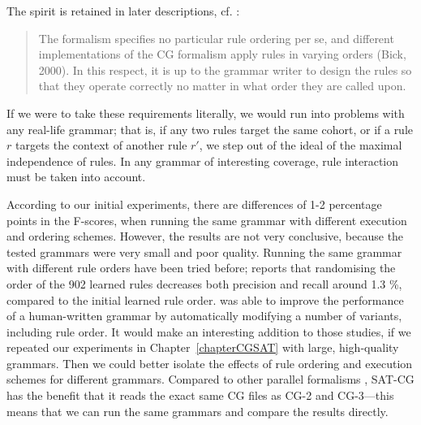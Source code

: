 \noindent The spirit is retained in later descriptions, cf. \cite{hulden2011cg_engine}:

\begin{quote} 
The formalism specifies no particular rule ordering per se, and different implementations of the CG formalism apply rules in varying orders (Bick, 2000).  In this respect, it is up to the grammar writer to design the rules so that they operate correctly no matter in what order they are called upon. 
\end{quote}

\noindent If we were to take these requirements literally, we would run into problems with any real-life grammar; that is, if any two rules target the same cohort, or if a rule $r$ targets the context of another rule $r'$, we step out of the ideal of the maximal independence of rules.
In any grammar of interesting coverage, rule interaction must be taken into account.

According to our initial experiments, there are differences of 1-2 percentage points in the F-scores, when running the same grammar with different execution and ordering schemes. However, the results are not very conclusive, because the tested grammars were very small and poor quality.
Running the same grammar with different rule orders have been tried before; \cite{lager01transformation} reports that randomising the order of the 902 learned rules 
decreases both precision and recall around 1.3 \%, compared to the initial learned rule order. %
\cite{bick2013tuning} was able to improve the performance of a human-written grammar by automatically modifying a number of variants, including rule order.
It would make an interesting addition to those studies, if we repeated our experiments in Chapter~\ref{chapterCGSAT} with large, high-quality grammars.
Then we could better isolate the effects of rule ordering and execution schemes for different grammars.
Compared to other parallel formalisms \cite{koskenniemi90,voutilainen1994designing,oflazer97votingconstraints,lager98}, SAT-CG has the benefit that it reads the exact same CG files as CG-2 and CG-3---this means that we can run the same grammars and compare the results directly. 




